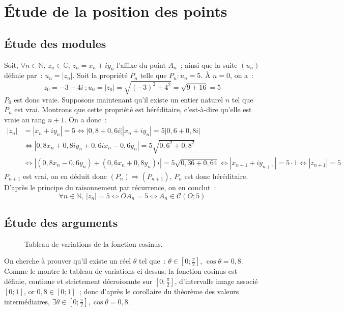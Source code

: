 \documentclass{article}
\newcommand{\abs}[1]{\left\vert #1 \right\vert}
\begin{document}
\section{Étude de la position des points}
\subsection{Étude des modules}
Soit, $\forall n\in\mathbb{N},\,z_n\in\mathbb{C},\,z_n=x_n+iy_n$ l'affixe du point $A_n$~; ainsi que la suite $(u_n)$ définie par~: $u_n = \abs{z_n}$. Soit la propriété $P_n$ telle que $P_n : u_n = 5$. À $n=0$, on a~:
\begin{displaymath}
 z_0 = -3 + 4i\ ; u_0 = \abs{z_0} = \sqrt{(-3)^2 + 4^2} = \sqrt{9+16} = 5
\end{displaymath}
$P_0$ est donc vraie. Supposons maintenant qu'il existe un entier naturel $n$ tel que $P_n$ est vrai. Montrons que cette propriété est héréditaire, c'est-à-dire qu'elle est vraie au rang $n+1$. On a donc~:
\begin{align*}
\abs{z_n} &=\abs{x_n + iy_n} = 5 \Leftrightarrow\abs{0,8 + 0,6i}\abs{x_n+iy_n}=5\abs{0,6+0,8i} \\
&\Leftrightarrow\abs{0,8x_n + 0,8iy_n + 0,6ix_n - 0,6y_n}=5\sqrt{0,6^2+0,8^2} \\
&\Leftrightarrow\abs{(0,8x_n - 0,6y_n) + (0,6x_n + 0,8y_n)i} = 5\sqrt{0,36 + 0,64} \Leftrightarrow \abs{x_{n+1}+iy_{n+1}} = 5\cdot 1 \Leftrightarrow \abs{z_{n+1}} =5
\end{align*}
$P_{n+1}$ est vrai, on en déduit donc $(P_n)\Rightarrow (P_{n+1})$, $P_n$ est donc héréditaire. D'après le principe du raisonnement par récurrence, on en conclut~:
\begin{displaymath}
 \forall n\in\mathbb{N},\, \abs{z_n} = 5 \Leftrightarrow O\!A_n=5 \Leftrightarrow A_n\in \mathscr{C}(O;5)
\end{displaymath}

\subsection{Étude des arguments}

\begin{figure}[h]
  \begin{center}
  \end{center}
 \caption{Tableau de variations de la fonction cosinus.}
\end{figure}
 On cherche à prouver qu'il existe un réel $\theta$ tel que~: $\theta \in\left[0;\frac{\pi}{2}\right]\!,\,\cos\theta=0,8$. Comme le montre le tableau de variations ci-dessus, la fonction cosinus est définie, continue et strictement décroissante sur $\left[0;\frac{\pi}{2}\right]$, d'intervalle image associé $\left[0;1\right]$, or $0,8\in\left[0;1\right]$~; donc d'après le corollaire du théorème des valeurs intermédiaires, $\exists\theta\in\left[0 ;\frac{\pi}{2}\right]\!, \cos\theta = 0,8$. 
 
\end{document}
